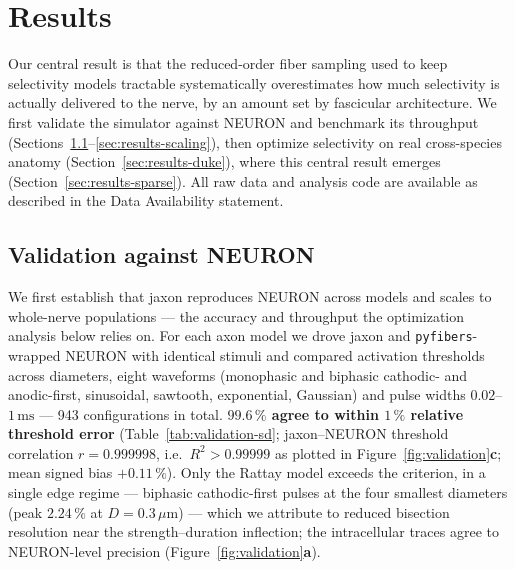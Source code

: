 \section{Results}
\label{sec:results}

Our central result is that the reduced-order fiber sampling used to
keep selectivity models tractable systematically overestimates how much
selectivity is actually delivered to the nerve, by an amount set by
fascicular architecture.  We first validate the simulator against
NEURON and benchmark its throughput
(Sections~\ref{sec:results-validation}--\ref{sec:results-scaling}),
then optimize selectivity on real cross-species anatomy
(Section~\ref{sec:results-duke}), where this central result emerges
(Section~\ref{sec:results-sparse}).  All raw data and analysis code are
available as described in the Data Availability statement.

\subsection{Validation against NEURON}
\label{sec:results-validation}

We first establish that jaxon reproduces NEURON across models and
scales to whole-nerve populations --- the accuracy and throughput the
optimization analysis below relies on.  For each axon model we drove
jaxon and \texttt{pyfibers}-wrapped NEURON with identical stimuli and
compared activation thresholds across diameters, eight waveforms
(monophasic and biphasic cathodic- and anodic-first, sinusoidal,
sawtooth, exponential, Gaussian) and pulse widths
$0.02$--$1\,\mathrm{ms}$ --- 943 configurations in total.
\textbf{$99.6\,\%$ agree to within $1\,\%$ relative threshold error}
(Table~\ref{tab:validation-sd}; jaxon--NEURON threshold correlation
$r = 0.999998$, i.e.\ $R^2 > 0.99999$ as plotted in
Figure~\ref{fig:validation}\textbf{c}; mean signed bias $+0.11\,\%$).  Only the Rattay model exceeds the criterion,
in a single edge regime --- biphasic cathodic-first pulses at the four
smallest diameters (peak $2.24\,\%$ at $D=0.3\,\mu\mathrm{m}$) --- which
we attribute to reduced bisection resolution near the
strength--duration inflection; the intracellular traces agree to
NEURON-level precision (Figure~\ref{fig:validation}\textbf{a}).

